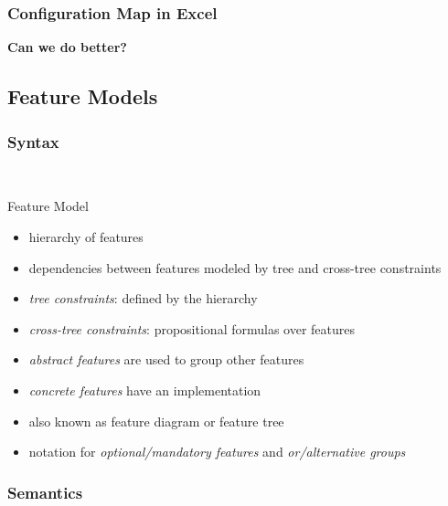 \subsubsection*{Configuration Map in Excel}

\begin{frame}{\myframetitle}
	\centering

	\textbf{Can we do better?}
\end{frame}

\subsection{Feature Models}

\subsubsection*{Syntax}

\begin{frame}{\myframetitle\ }
	\begin{fancycolumns}
		\centering
		\featureDiagramConfigurableDatabase
		
		\featureDiagramLegend
	\nextcolumn
		\begin{definition}{Feature Model }
			\begin{itemize}
				\item hierarchy of features
				\item dependencies between features modeled by tree and cross-tree constraints
				\item \emph{tree constraints}: defined by the hierarchy
				\item \emph{cross-tree constraints}: propositional formulas over features
				\item \emph{abstract features} are used to group other features
				\item \emph{concrete features} have an implementation
				\item also known as feature diagram or feature tree
				\item notation for \emph{optional/mandatory features} and \emph{or/alternative groups}
			\end{itemize}
		\end{definition}
	\end{fancycolumns}
\end{frame}

\subsubsection*{Semantics}

